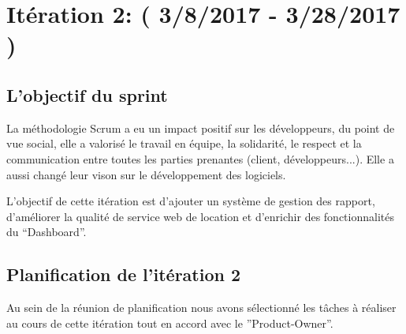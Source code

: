 \section{Itération 2: ( 3/8/2017 - 3/28/2017 )}

\subsection{L'objectif du sprint}
La méthodologie Scrum a eu un impact positif sur les développeurs, du point de vue social, elle
a valorisé le travail en équipe, la solidarité, le respect et la communication entre toutes les
parties prenantes (client, développeurs...). Elle a aussi changé leur vison sur le développement
des logiciels.

L'objectif de cette itération est d'ajouter un système de gestion des rapport, d'améliorer
la qualité de service web de location et d'enrichir des fonctionnalités du ``Dashboard''.
\subsection{Planification de l'itération 2}
  Au sein de la réunion de planification nous avons sélectionné les tâches à réaliser au
  cours de cette itération tout en accord avec le ”Product-Owner”.
